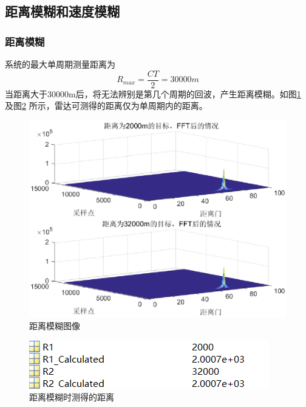 \documentclass[12pt]{article}
\begin{document}
\subsection{距离模糊和速度模糊}
\subsubsection{距离模糊}
系统的最大单周期测量距离为
\begin{equation}\label{gujizuidazhi}
  R_{max}=\frac{CT}{2}=30000m
\end{equation}
当距离大于30000m后，将无法辨别是第几个周期的回波，产生距离模糊。如图\ref{julimohu1}
及图\ref{julimohu2}
所示，雷达可测得的距离仅为单周期内的距离。
\begin{figure}[htbp]
  \centering
  \includegraphics[width=\textwidth]{julimohu1}
  \caption{距离模糊图像}\label{julimohu1}
\end{figure}
\begin{figure}[htbp]
  \centering
  \includegraphics[width=.6\textwidth]{TIM20190623172648}
  \caption{距离模糊时测得的距离}\label{julimohu2}
\end{figure}
\end{document}
